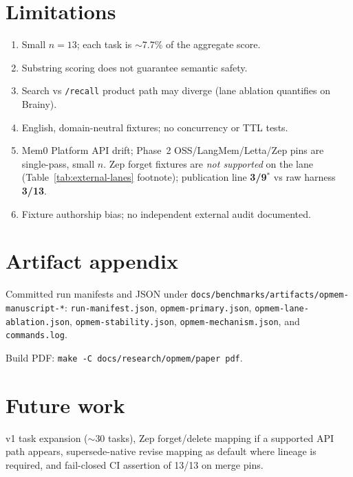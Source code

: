 \documentclass[11pt]{article}
\begin{document}
\section{Limitations}
\label{sec:limitations}
\begin{enumerate}
\item Small $n=13$; each task is $\sim$7.7\% of the aggregate score.
\item Substring scoring does not guarantee semantic safety.
\item Search vs \texttt{/recall} product path may diverge (lane ablation quantifies on Brainy).
\item English, domain-neutral fixtures; no concurrency or TTL tests.
\item Mem0 Platform API drift; Phase~2 OSS/LangMem/Letta/Zep pins are single-pass, small $n$. Zep forget fixtures are \emph{not supported} on the lane (Table~\ref{tab:external-lanes} footnote); publication line \textbf{3/9$^{*}$} vs raw harness \textbf{3/13}.
\item Fixture authorship bias; no independent external audit documented.
\end{enumerate}

\section{Artifact appendix}
Committed run manifests and JSON under
\texttt{docs/benchmarks/artifacts/opmem-manuscript-*}:
\texttt{run-manifest.json}, \texttt{opmem-primary.json},
\texttt{opmem-lane-ablation.json}, \texttt{opmem-stability.json},
\texttt{opmem-mechanism.json}, and \texttt{commands.log}.

Build PDF: \texttt{make -C docs/research/opmem/paper pdf}.

\section{Future work}
v1 task expansion ($\sim$30 tasks), Zep forget/delete mapping if a supported API path appears,
supersede-native revise mapping as default where lineage is required,
and fail-closed CI assertion of 13/13 on merge pins.



\end{document}

